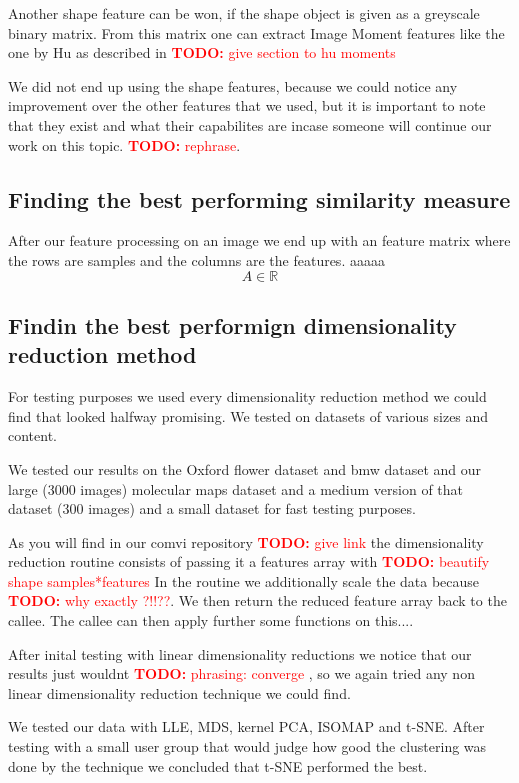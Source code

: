 \documentclass[journal]{vgtc}       %
\newcommand{\todo}[1]{\textcolor{red}{\textbf{TODO:} #1}}
\begin{document}
Another shape feature can be won, if the shape object is given as a greyscale binary matrix. From this matrix one can extract Image Moment features like the one by Hu as described in \todo{give section to hu moments}

We did not end up using the shape features, because we could notice any improvement over the other features that we used, but it is important to note that they exist and what their capabilites are incase someone will continue our work on this topic. \todo{rephrase}.



\subsection{Finding the best performing similarity measure}

After our feature processing on an image we end up with an feature matrix where the rows are samples  and the columns are the features. aaaaa \[A \in \mathbb{R}\]


\subsection{Findin the best performign dimensionality reduction method}
For testing purposes we used every dimensionality reduction method we could find that looked halfway promising. We tested on datasets of various sizes and content.

We tested our results on the Oxford flower dataset and bmw dataset and our large (3000 images) molecular maps dataset and a medium version of that dataset (300 images) and a small dataset for fast testing purposes.

As you will find in our comvi repository \todo{give link} the dimensionality reduction routine consists of passing it a features array with \todo{beautify shape samples*features}
In the routine we additionally scale the data because \todo{why exactly ?!!??}.
We then return the reduced feature array back to the callee. The callee can then apply further some functions on this....

After inital testing with linear dimensionality reductions we notice that our results just wouldnt \todo{phrasing: converge }, so we again tried any non linear dimensionality reduction technique we could find.

We tested our data with LLE, MDS, kernel PCA, ISOMAP and t-SNE.
After testing with a small user group that would judge how good the clustering was done by the technique we concluded that t-SNE performed the best.
\end{document}
